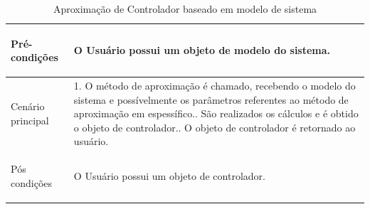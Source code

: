 \begin{table}[H]
\begin{center}
\begin{tabularx}{\textwidth}{|>{\bfseries\raggedright\arraybackslash\center}m{5cm}|X|}
            Pré-condições                                   & O Usuário possui um objeto de modelo do sistema.                                                                                                                                                                                                                                           \\ \hline
            Cenário principal                               & 1. O método de aproximação é chamado, recebendo o modelo do sistema e possívelmente os parâmetros referentes ao método de aproximação em espessífico.\newline 2. São realizados os cálculos e é obtido o objeto de controlador.\newline 3. O objeto de controlador é retornado ao usuário. \\ \hline
            Pós condições                                   & O Usuário possui um objeto de controlador.                                                                                                                                                                                                                                                 \\ \hline
        \end{tabularx}
        \caption{Aproximação de Controlador baseado em modelo de sistema}
        \label{tab:uc4}
    \end{center}
\end{table}

